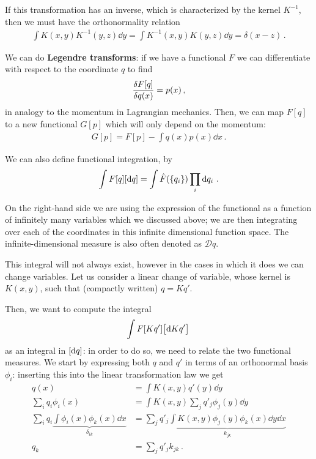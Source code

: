 \documentclass[main.tex]{subfiles}
\begin{document}
If this transformation has an inverse, which is characterized by the kernel \(K^{-1}\), then we must have the orthonormality relation 
%
\begin{align}
\int K(x,y) K^{-1} (y, z) \dd{y} =
\int K^{-1}(x,y) K (y, z) \dd{y} =
\delta (x-z)
\,.
\end{align}

We can do \textbf{Legendre transforms}: if we have a functional \(F\) we can differentiate with respect to the coordinate \(q\) to find 
%
\begin{align}
\fdv{F[q]}{q(x)} = p(x)
\,,
\end{align}
%
in analogy to the momentum in Lagrangian mechanics. Then, we can map \(F[q]\) to a new functional \(G[p]\) which will only depend on the momentum: 
%
\begin{align}
G[p]= F[p] - \int q(x) p(x) \dd{x}
\,.
\end{align}

We can also define functional integration, by 
%
\begin{align}
\int F[q] \qty[ \dd{q}] = \int \hat{F}(\qty{q_i}) \prod_i \dd{q_i}
\,.
\end{align}

On the right-hand side we are using the expression of the functional as a function of infinitely many variables which we discussed above;
we are then integrating over each of the coordinates in this infinite dimensional function space.
The infinite-dimensional measure is also often denoted as \(\mathcal{D}q\). 

This integral will not always exist, however in the cases in which it does we can change variables. 
Let us consider a linear change of variable, whose kernel is \(K(x, y)\), such that (compactly written) \(q = K q'\). 

Then, we want to compute the integral 
%
\begin{align}
\int F[Kq'] \qty[ \dd{Kq'}] 
\,
\end{align}
%
as an integral in \(\qty[ \dd{q}]\): in order to do so, we need to relate the two functional measures. 
We start by expressing both \(q\) and \(q'\) in terms of an orthonormal basis \(\phi _i\): inserting this into the linear transformation law we get 
%
\begin{align}
q(x) &= \int K(x, y) q'(y) \dd{y}  \\
\sum _{i} q_i \phi _i(x) &= \int K(x, y) \sum _{j} q'_j \phi _j (y) \dd{y}  \\
\sum _{i} q_i \underbrace{\int \phi _i (x) \phi _k (x) \dd{x}}_{ \delta_{ik}} 
&= 
\sum _{j} q'_j \underbrace{\int K(x, y) \phi _j (y) \phi _k (x) \dd{y} \dd{x}}_{ k_{jk}}  \\
q_k &= \sum _{j} q'_j k_{jk}
\,.
\end{align}
\end{document}
